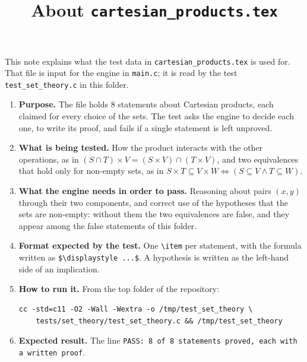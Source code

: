 \documentclass[11pt,a4paper]{article}
\title{About \texttt{cartesian\_products.tex}}
\author{}
\date{}
\begin{document}
\maketitle
This note explains what the test data in \texttt{cartesian\_products.tex} is used for. That file is input for the engine in \texttt{main.c}; it is read by the test \texttt{test\_set\_theory.c} in this folder.

\begin{enumerate}
\item \textbf{Purpose.} The file holds 8 statements about Cartesian products, each claimed for every choice of the sets. The test asks the engine to decide each one, to write its proof, and fails if a single statement is left unproved.

\item \textbf{What is being tested.} How the product interacts with the other operations, as in $(S \cap T) \times V = (S \times V) \cap (T \times V)$, and two equivalences that hold only for non-empty sets, as in $S \times T \subseteq V \times W \iff (S \subseteq V \land T \subseteq W)$.

\item \textbf{What the engine needs in order to pass.} Reasoning about pairs $(x, y)$ through their two components, and correct use of the hypotheses that the sets are non-empty: without them the two equivalences are false, and they appear among the false statements of this folder.

\item \textbf{Format expected by the test.} One \texttt{\textbackslash item} per statement, with the formula written as \texttt{\$\textbackslash displaystyle ...\$}. A hypothesis is written as the left-hand side of an implication.

\item \textbf{How to run it.} From the top folder of the repository:
\begin{verbatim}
cc -std=c11 -O2 -Wall -Wextra -o /tmp/test_set_theory \
    tests/set_theory/test_set_theory.c && /tmp/test_set_theory
\end{verbatim}

\item \textbf{Expected result.} The line \texttt{PASS: 8 of 8 statements proved, each with a written proof}.
\end{enumerate}
\end{document}
